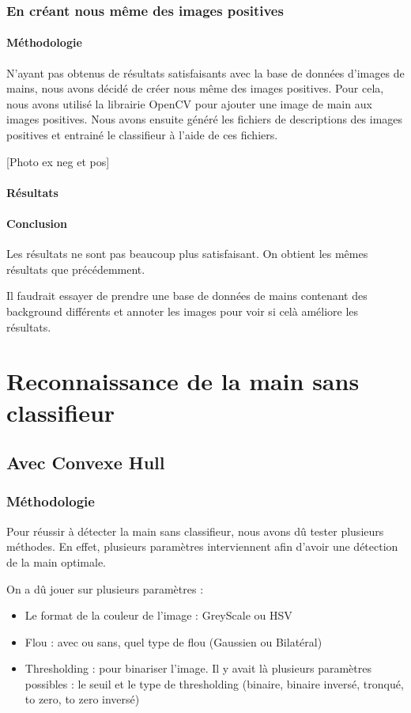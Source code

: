 \documentclass[11pt]{article}
\begin{document}
\subsubsection{En créant nous même des images positives}
\paragraph{Méthodologie}
N'ayant pas obtenus de résultats satisfaisants avec la base de données d'images de mains, nous avons décidé de créer nous même des images positives. Pour cela, nous avons utilisé la librairie OpenCV pour ajouter une image de main aux images positives. Nous avons ensuite généré les fichiers de descriptions des images positives et entrainé le classifieur à l'aide de ces fichiers. \bigbreak


[Photo ex neg et pos]

\paragraph{Résultats}

\paragraph{Conclusion}
Les résultats ne sont pas beaucoup plus satisfaisant. On obtient les mêmes résultats que précédemment. \bigbreak

Il faudrait essayer de prendre une base de données de mains contenant des background différents et annoter les images pour voir si celà améliore les résultats. \bigbreak


\section{Reconnaissance de la main sans classifieur}
\subsection{Avec Convexe Hull}
\subsubsection{Méthodologie}
Pour réussir à détecter la main sans classifieur, nous avons dû tester plusieurs méthodes. En effet, plusieurs paramètres interviennent afin d'avoir une détection de la main optimale.

On a dû jouer sur plusieurs paramètres :
\begin{itemize}
    \item Le format de la couleur de l'image : GreyScale ou HSV
    \item Flou : avec ou sans, quel type de flou (Gaussien ou Bilatéral)
    \item Thresholding : pour binariser l'image. Il y avait là plusieurs paramètres possibles : le seuil et le type de thresholding (binaire, binaire inversé, tronqué, to zero, to zero inversé)
\end{itemize}
\end{document}
